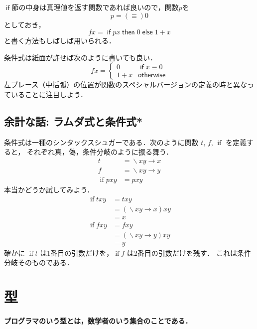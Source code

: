 \documentclass[a5paper,draft]{jsbook}
\newenvironment{leader}{\begingroup\bf}{\endgroup}
\newcommand{\mathUnaryOperator}[1]{\operatorname{#1}}
\newcommand{\mathLambda}{\mathUnaryOperator{\backslash}}
\newcommand{\mathLambdaArrow}{\rightarrow}
\newcommand{\mathSpecialFunction}[1]{\operatorname{\mathrm{#1}}}
\newcommand{\mathIfFunc}{\mathSpecialFunction{if}}
\newcommand{\mathKeyword}[1]{\operatorname{\textsf{#1}}}
\newcommand{\mathIf}{\mathKeyword{if}}
\newcommand{\mathThen}{\mathKeyword{then}}
\newcommand{\mathElse}{\mathKeyword{else}}
\newcommand{\mathOtherwise}{\mathKeyword{otherwise}}
\newcommand{\mathLambdaExpression}[2]{\mathLambda#1\mathLambdaArrow#2}
\begin{document}
$\mathIf$節の中身は真理値を返す関数であれば良いので，関数$p$を
\begin{equation}
p=(\equiv)0
\end{equation}
としておき，
\begin{equation}
fx=\mathIf px\mathThen0\mathElse1+x
\end{equation}
と書く方法もしばしば用いられる．

条件式は紙面が許せば次のように書いても良い．
\begin{equation}
fx=\begin{cases}
0&\mathIf x\equiv0\\
1+x&\mathOtherwise
\end{cases}
\end{equation}
左ブレース（中括弧）の位置が関数のスペシャルバージョンの定義の時と異なっていることに注目しよう．

\section{余計な話: ラムダ式と条件式*}

条件式は一種のシンタックスシュガーである．次のように関数 $t$, $f$, $\mathIfFunc$ を定義すると，
それぞれ真，偽，条件分岐のように振る舞う．
\begin{align}
t&=\mathLambdaExpression{xy}{x}\\
f&=\mathLambdaExpression{xy}{y}\\
\mathIfFunc pxy&=pxy
\end{align}
本当かどうか試してみよう．
\begin{align}
\mathIfFunc txy&=txy\\
&=\left(\mathLambdaExpression{xy}{x}\right)xy\\
&=x\\
\mathIfFunc fxy&=fxy\\
&=\left(\mathLambdaExpression{xy}{y}\right)xy\\
&=y
\end{align}
確かに $\mathIfFunc t$ は1番目の引数だけを，$\mathIfFunc f$ は2番目の引数だけを残す．
これは条件分岐そのものである．


\chapter{型}

\begin{leader}
プログラマのいう型とは，数学者のいう集合のことである．
\end{leader}
\end{document}
